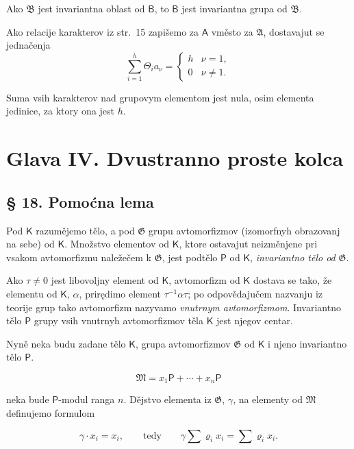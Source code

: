 \documentclass[11pt]{article}
\begin{document}
Ako \(\mathfrak B\) jest invariantna oblast od \(\mathsf B\), to \(\mathsf B\) jest invariantna grupa od \(\mathfrak B\).

Ako relacije karakterov iz str.~15 zapišemo za \(\mathsf A\) vměsto za \(\mathfrak A\), dostavajut se jednačenja
\[
\sum_{i=1}^{h} \Theta_i a_\nu =
\begin{cases}
h & \nu=1,\\
0 & \nu\ne 1.
\end{cases}
\]

Suma vsih karakterov nad grupovym elementom jest nula, osim elementa jedinice, za ktory ona jest \(h\).

\section*{Glava IV. Dvustranno proste kolca}\label{kapitel-iv.-zweiseitig-einfache-ringe}

\subsection*{§ 18. Pomoćna lema}\label{ein-hilfssatz}

Pod \(\mathsf K\) razumějemo tělo, a pod \(\mathfrak G\) grupu avtomorfizmov (izomorfnyh obrazovanj na sebe) od \(\mathsf K\). Množstvo elementov od \(\mathsf K\), ktore ostavajut neizměnjene pri vsakom avtomorfizmu naležečem k \(\mathfrak G\), jest podtělo \(\mathsf P\) od \(\mathsf K\), \emph{invariantno tělo od} \(\mathfrak G\).

Ako \(\tau\ne 0\) jest libovoljny element od \(\mathsf K\), avtomorfizm od \(\mathsf K\) dostava se tako, že elementu od \(\mathsf K\), \(\alpha\), prirędimo element \(\tau^{-1}\alpha\tau\); po odpovědajučem nazvanju iz teorije grup tako avtomorfizm nazyvamo \emph{vnutrnym avtomorfizmom}. Invariantno tělo \(\mathsf P\) grupy vsih vnutrnyh avtomorfizmov těla \(\mathsf K\) jest njegov centar.

Nyně neka budu zadane tělo \(\mathsf K\), grupa avtomorfizmov \(\mathfrak G\) od \(\mathsf K\) i njeno invariantno tělo \(\mathsf P\).

\[
\mathfrak M=x_1\mathsf P+\cdots+x_n\mathsf P
\]

neka bude \(\mathsf P\)-modul ranga \(n\). Dějstvo elementa iz \(\mathfrak G\), \(\gamma\), na elementy od \(\mathfrak M\) definujemo formulom

\[
\gamma\cdot x_i=x_i,\qquad\text{tedy}\qquad
\gamma\sum \varrho_i x_i=\sum \varrho_i x_i.
\]
\end{document}
